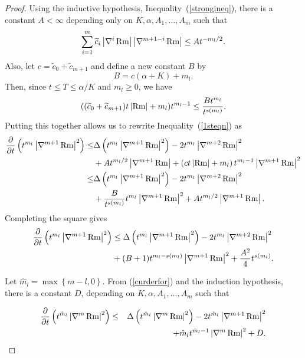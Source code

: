 \begin{proof}
Using the inductive hypothesis, Inequality~(\ref{strongineq}), there is a constant
$A<\infty$ depending only on $K,\alpha,A_1,\ldots,A_m$ such that
$$
\sum_{i=1}^{m}\widetilde c_{i}\left\vert \nabla
^{i}\operatorname{Rm}\right\vert \left\vert
\nabla^{m+1-i}\operatorname{Rm} \right\vert \leq At^{-m_l/2}.
$$
Also, let $c=\tilde c_{0}+\tilde c_{m+1}$ and define a new  constant
$B$
by%
$$B=c(\alpha+K)+m_l.$$ Then, since $t\le T\le \alpha/K$ and $m_l\ge 0$, we have
$$((\widetilde c_{0}+\widetilde c_{m+1})t\left\vert\operatorname{Rm}\right\vert +m_l)t^{m_l-1}\le
\frac{Bt^{m_l}}{t^{s(m_l)}}.$$ Putting this together allows us to
rewrite Inequality~(\ref{1steqn}) as
\begin{align*}
\frac{\partial}{\partial t}\left(  t^{m_l}\left\vert
\nabla^{m+1}\operatorname{Rm}\right\vert ^{2}\right)
 \leq &\Delta\left(  t^{m_l }\left\vert \nabla
^{m+1}\operatorname{Rm}\right\vert ^{2}\right)  -2t^{m_l }
\left\vert \nabla^{m+2}\operatorname{Rm}\right\vert ^{2}\\
 &
+At^{m_l /2}\left\vert \nabla^{m+1} \operatorname{Rm}\right\vert
+\left(ct\left\vert \operatorname{Rm}\right\vert +m_l \right)
t^{m_l -1}\left\vert \nabla^{m+1}\operatorname{Rm}\right\vert
^{2}\\
 \leq &\Delta\left(  t^{m_l }\left\vert \nabla
^{m+1}\operatorname{Rm}\right\vert ^{2}\right)  -2t^{m_l }
\left\vert \nabla^{m+2}\operatorname{Rm}\right\vert ^{2}\\
& +
\frac{B}{t^{s(m_l)}}t^{m_l}\left\vert\nabla^{m+1}\operatorname{Rm}\right\vert^2
+ At^{m_l/2}\left\vert\nabla^{m+1}\operatorname{Rm}\right\vert.
\end{align*}
Completing the square gives
\begin{align*}
\frac{\partial}{\partial t}\left(  t^{m_l}\left\vert
\nabla^{m+1}\operatorname{Rm}\right\vert ^{2}\right)
 &
\leq\Delta\left( t^{m_l }\left\vert \nabla
^{m+1}\operatorname{Rm}\right\vert ^{2}\right) -2t^{m_l  }
\left\vert \nabla^{m+2}\operatorname{Rm}\right\vert ^{2}\\
&  +(B+1)t^{m_l  -s(m_l)}\left\vert \nabla^{m+1}
\operatorname{Rm}\right\vert ^{2}+\frac{A^2}{4}t^{s(m_l)}.
\end{align*}

Let $\hat{m}_l = \max\left\{  m-l,0\right\} $. From
(\ref{curderfor}) and the induction hypothesis, there is a constant
$D$, depending on $K,\alpha,A_1,\ldots,A_m$ such that

\begin{eqnarray*}
\frac{\partial}{\partial t}\left(  t^{\hat{m}_l }\left\vert
\nabla^{m}\operatorname{Rm}\right\vert ^{2}\right) & \leq &
\Delta\left( t^{\hat{m}_l} \left\vert
\nabla^{m}\operatorname{Rm}\right\vert ^{2}\right) -2t^{\hat{m}_l
}\left\vert
\nabla^{m+1}\operatorname{Rm}\right\vert ^{2}\\
& & +\hat{m}_l  t^{\hat{m}_l  -1}\left\vert
\nabla^{m}\operatorname{Rm}\right\vert ^{2}+D.
\end{eqnarray*}


\end{proof}
